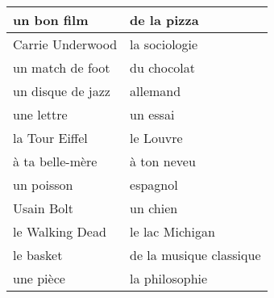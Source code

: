\documentclass{article}
\date{}
\newcommand{\tabrowEnd}{\rule{0pt}{45pt}\\}
\begin{document}
  \centering
  \noindent
  {\LARGE
    \begin{tabular}{| p{} | p{} |}
      \hline
      un bon film          & de la pizza \tabrowEnd
      \hline
      Carrie Underwood     & la sociologie \tabrowEnd
      \hline
      un match de foot     & du chocolat \tabrowEnd
      \hline
      un disque de jazz    & allemand \tabrowEnd
      \hline
      une lettre           & un essai \tabrowEnd
      \hline
      la Tour Eiffel       & le Louvre \tabrowEnd
      \hline
      à ta belle-mère      & à ton neveu \tabrowEnd
      \hline
      un poisson           & espagnol \tabrowEnd
      \hline
      Usain Bolt           & un chien \tabrowEnd
      \hline
      le Walking Dead      & le lac Michigan \tabrowEnd
      \hline
      le basket            & de la musique classique \tabrowEnd
      \hline
      une pièce            & la philosophie \tabrowEnd
      \hline
    \end{tabular}
  }
\end{document}
